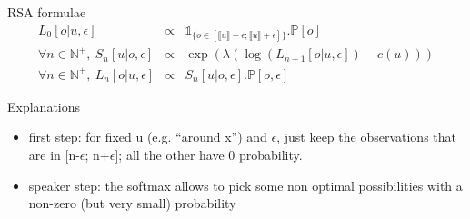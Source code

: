 \documentclass[xcolor=table, hyperref={pdfpagelabels=false}]{beamer}
\begin{document}
\begin{frame}{RSA formulae}
\begin{equation*}
\begin{array}{rcl}
L_0[o|u, \epsilon] &\propto& \mathds{1}_{\lbrace o \in [\llbracket u \rrbracket - \epsilon; \llbracket u \rrbracket + \epsilon]\rbrace} . \mathds{P}[o] \\
\forall n \in \mathds{N}^+, \ S_n[u|o, \epsilon] &\propto& \exp \left( \lambda (\log(L_{n-1}[o|u,\epsilon]) - c(u))\right)\\
\forall n \in \mathds{N}^+, \ L_n[o|u, \epsilon] &\propto& S_n[u|o, \epsilon ] .\mathds{P}[o, \epsilon]
\end{array}
\end{equation*}
\begin{block}{Explanations}
	\begin{itemize}
		\item first step: for fixed u (e.g. ``around x'') and $\epsilon$, just keep the observations that are in [n-$\epsilon$; n+$\epsilon$]; all the other have 0 probability.
		\item speaker step: the softmax allows to pick some non optimal possibilities with a non-zero (but very small) probability
	\end{itemize}
\end{block}
\end{frame}
\end{document}
